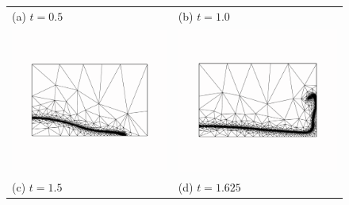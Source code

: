 \begin{figure}[tbp]
\begin{center}
\begin{tabular}{ll}
(a) $t = 0.5$ & (b) $t = 1.0$\\
\includegraphics[width=7cm, trim=2.5cm 4.5cm 2.5cm 4.5cm, clip=true]{examples_images/water_collapse/water_collapse_100_mesh.pdf} & \includegraphics[width=7cm, trim=2.5cm 4.5cm 2.5cm 4.5cm, clip=true]{examples_images/water_collapse/water_collapse_200_mesh.pdf} \\
(c) $t = 1.5$ & (d) $t = 1.625$ \\

\end{tabular}
\end{center}
\end{figure}
